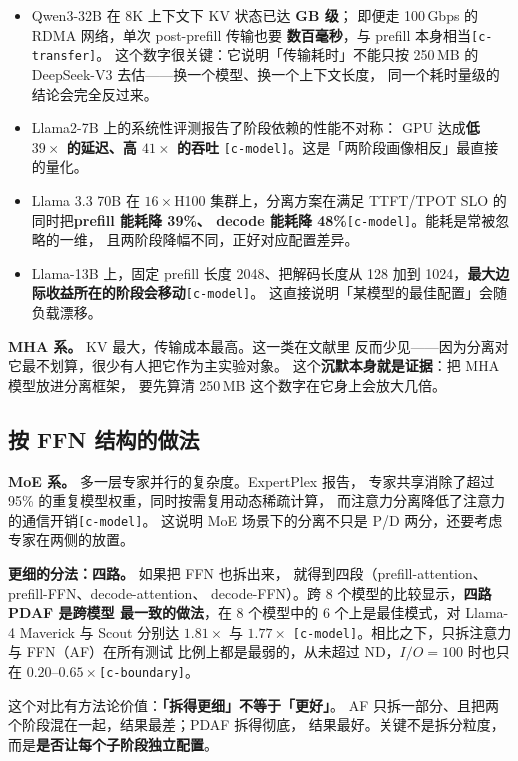 \begin{itemize}
\item Qwen3-32B 在 8K 上下文下 KV 状态已达 \textbf{GB 级}；
  即便走 100\,Gbps 的 RDMA 网络，单次 post-prefill 传输也要
  \textbf{数百毫秒}，与 prefill 本身相当\texttt{[c-transfer]}。
  这个数字很关键：它说明「传输耗时」不能只按 250\,MB 的
  DeepSeek-V3 去估——换一个模型、换一个上下文长度，
  同一个耗时量级的结论会完全反过来。
\item Llama2-7B 上的系统性评测报告了阶段依赖的性能不对称：
  GPU 达成\textbf{低 $39\times$ 的延迟、高 $41\times$ 的吞吐}
  \texttt{[c-model]}。这是「两阶段画像相反」最直接的量化。
\item Llama 3.3 70B 在 $16\times$H100 集群上，分离方案在满足
  TTFT/TPOT SLO 的同时把\textbf{prefill 能耗降 39\%、
  decode 能耗降 48\%}\texttt{[c-model]}。能耗是常被忽略的一维，
  且两阶段降幅不同，正好对应配置差异。
\item Llama-13B 上，固定 prefill 长度 2048、把解码长度从 128 加到
  1024，\textbf{最大边际收益所在的阶段会移动}\texttt{[c-model]}。
  这直接说明「某模型的最佳配置」会随负载漂移。
\end{itemize}

\noindent\textbf{MHA 系。} KV 最大，传输成本最高。这一类在文献里
反而少见——因为分离对它最不划算，很少有人把它作为主实验对象。
这个\textbf{沉默本身就是证据}：把 MHA 模型放进分离框架，
要先算清 250\,MB 这个数字在它身上会放大几倍。

\subsection{按 FFN 结构的做法}

\noindent\textbf{MoE 系。} 多一层专家并行的复杂度。ExpertPlex 报告，
专家共享消除了超过 95\% 的重复模型权重，同时按需复用动态稀疏计算，
而注意力分离降低了注意力的通信开销\texttt{[c-model]}。
这说明 MoE 场景下的分离不只是 P/D 两分，还要考虑专家在两侧的放置。

\noindent\textbf{更细的分法：四路。} 如果把 FFN 也拆出来，
就得到四段（prefill-attention、prefill-FFN、decode-attention、
decode-FFN）。跨 8 个模型的比较显示，\textbf{四路 PDAF 是跨模型
最一致的做法}，在 8 个模型中的 6 个上是最佳模式，对 Llama-4
Maverick 与 Scout 分别达 $1.81\times$ 与 $1.77\times$
\texttt{[c-model]}。相比之下，只拆注意力与 FFN（AF）在所有测试
比例上都是最弱的，从未超过 ND，$I/O=100$ 时也只在
$0.20$--$0.65\times$\texttt{[c-boundary]}。

这个对比有方法论价值：\textbf{「拆得更细」不等于「更好」}。
AF 只拆一部分、且把两个阶段混在一起，结果最差；PDAF 拆得彻底，
结果最好。关键不是拆分粒度，而是\textbf{是否让每个子阶段独立配置}。

